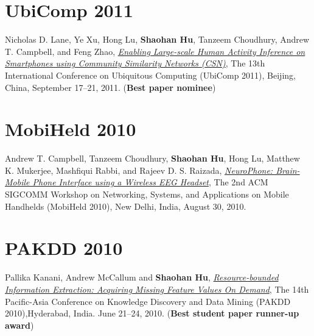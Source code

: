 \section{\sc UbiComp 2011}\hypertarget{lane2011ubicomp}{} Nicholas D. Lane, Ye Xu, Hong Lu, \textbf{Shaohan Hu}, Tanzeem Choudhury, Andrew T. Campbell, and Feng Zhao, \href{http://portal.acm.org/citation.cfm?id=2030160}{\emph{Enabling Large-scale Human Activity Inference on Smartphones using Community Similarity Networks (CSN)}}, \textsf{The 13th International Conference on Ubiquitous Computing (UbiComp 2011)}, Beijing, China, September 17--21, 2011. (\textbf{Best paper nominee})

\section{\sc MobiHeld 2010}\hypertarget{campbell2010mobiheld}{} Andrew T. Campbell, Tanzeem Choudhury, \textbf{Shaohan Hu}, Hong Lu, Matthew K. Mukerjee, Mashfiqui Rabbi, and Rajeev D. S. Raizada, \href{http://portal.acm.org/citation.cfm?id=1851326}{\emph{NeuroPhone: Brain-Mobile Phone Interface using a Wireless EEG Headset}}, \textsf{The 2nd ACM SIGCOMM Workshop on Networking, Systems, and Applications on Mobile Handhelds (MobiHeld 2010)}, New Delhi, India, August 30, 2010.

\section{\sc PAKDD 2010}\hypertarget{kanani2010pakdd}{} Pallika Kanani, Andrew McCallum and \textbf{Shaohan Hu}, \href{http://www.springerlink.com/content/j41w758434321108}{\emph{Resource-bounded Information Extraction: Acquiring Missing Feature Values On Demand}}, \textsf{The 14th Pacific-Asia Conference on Knowledge Discovery and Data Mining (PAKDD 2010)},Hyderabad, India. June 21--24, 2010. (\textbf{Best student paper runner-up award})
